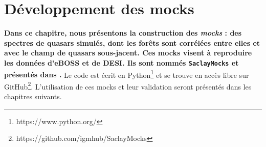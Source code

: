 \documentclass[11pt, twoside, a4paper, openright]{report}
\begin{document}

\graphicspath{ {../figures/mocks/} }

\chapter{Développement des mocks}
\minitoc
\newpage
\thispagestyle{fancy}

\textbf{Dans ce chapitre, nous présentons la construction des \emph{mocks} : des spectres de quasars simulés, dont les forêts \lya{}
sont corrélées entre elles et avec le champ de quasars sous-jacent.
Ces mocks visent à reproduire les données d'eBOSS et de DESI. Ils sont nommés \texttt{SaclayMocks} et présentés dans \citet{CITE:mocks}.}
Le code est écrit en Python\footnote{https://www.python.org/} et se trouve en accès libre sur GitHub\footnote{https://github.com/igmhub/SaclayMocks}. L'utilisation de ces mocks et leur validation seront présentés dans les chapitres suivants.
\end{document}

